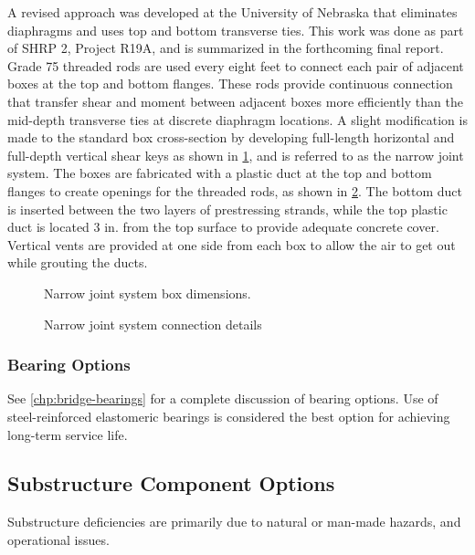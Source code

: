 A revised approach was developed at the University of Nebraska that eliminates diaphragms and uses top and
bottom transverse ties. This work was done as part of SHRP 2, Project R19A, and is summarized in the forthcoming
final report. Grade 75 threaded rods are used every eight feet to connect each pair of adjacent boxes at the top and
bottom flanges. These rods provide continuous connection that transfer shear and moment between adjacent boxes
more efficiently than the mid-depth transverse ties at discrete diaphragm locations. A slight modification is made to
the standard box cross-section by developing full-length horizontal and full-depth vertical shear keys as shown in
\cref{fig:narrow-joint-system-box}, and is referred to as the narrow joint system. The boxes are fabricated with a plastic duct at the top and
bottom flanges to create openings for the threaded rods, as shown in \cref{fig:narrow-joint-connection-details}. The bottom duct is inserted
between the two layers of prestressing strands, while the top plastic duct is located 3 in. from the top surface to provide adequate concrete cover. Vertical vents are provided at one side from each box to allow the air to get out
while grouting the ducts.

\begin{figure}
  \caption{Narrow joint system box dimensions.}
  \label{fig:narrow-joint-system-box}
\end{figure}

\begin{figure}
  \caption{Narrow joint system connection details}
  \label{fig:narrow-joint-connection-details}
\end{figure}

\subsubsection{Bearing Options}
See \cref{chp:bridge-bearings} for a complete discussion of bearing options. Use of steel-reinforced elastomeric bearings is considered the best option for achieving long-term service life.

\subsection{Substructure Component Options}
Substructure deficiencies are primarily due to natural or man-made hazards, and operational issues.


